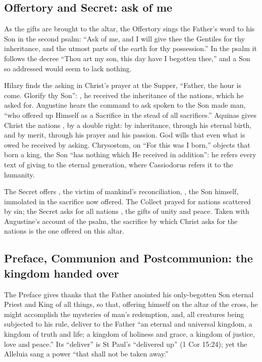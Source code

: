 \subsection{Offertory and Secret: ask of me}

As the gifts are brought to the altar, the Offertory sings the Father's word
to his Son in the second psalm: ``Ask of me, and I will give thee the Gentiles
for thy inheritance, and the utmost parts of the earth for thy possession.''
In the psalm it follows the decree ``Thou art my son, this day have I begotten
thee,'' and a Son so addressed would seem to lack nothing.

Hilary finds the asking in Christ's prayer at the Supper, ``Father, the hour
is come. Glorify thy Son'': , he received the inheritance of the nations, which he asked for.
Augustine hears the command to ask spoken to the Son made man, ``who offered
up Himself as a Sacrifice in the stead of all sacrifices.'' Aquinas gives
Christ the nations , by a double right: by inheritance,
through his eternal birth, and by merit, through his prayer and his passion.
God wills that even what is owed be received by asking. Chrysostom, on ``For
this was I born,'' objects that born a king, the Son ``has nothing which He
received in addition'': he refers every text of giving to the eternal
generation, where Cassiodorus refers it to the humanity.

The Secret offers , the victim
of mankind's reconciliation, ,
the Son himself, immolated in the sacrifice now offered. The Collect prayed
for nations scattered by sin; the Secret asks for all nations , the gifts of unity and peace. Taken with Augustine's account
of the psalm, the sacrifice by which Christ asks for the nations is the one
offered on this altar.

\subsection{Preface, Communion and Postcommunion: the kingdom handed over}

The Preface gives thanks that the Father anointed his only-begotten Son
eternal Priest and King of all things, so that, offering himself on the altar
of the cross, he might accomplish the mysteries of man's redemption, and, all
creatures being subjected to his rule, deliver to the Father ``an eternal and
universal kingdom, a kingdom of truth and life; a kingdom of holiness and
grace, a kingdom of justice, love and peace.'' Its ``deliver'' is St
Paul's ``delivered up'' (1 Cor 15:24); yet the Alleluia sang a power ``that shall not
be taken away.''

